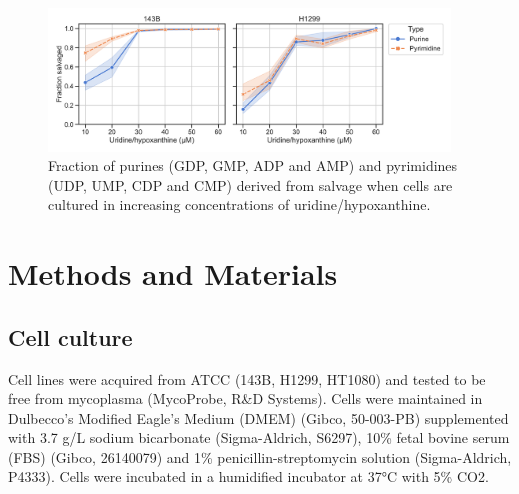\begin{figure}
    \centering
    \includegraphics[width=0.95\textwidth]{figures/chap2/sal_frac_conc.pdf}
    \caption[Salvage as a function of Urd/Hpx concentration]{
    Fraction of purines (GDP, GMP, ADP and AMP) and pyrimidines (UDP, UMP, CDP and CMP) derived from salvage when cells are cultured in increasing concentrations of uridine/hypoxanthine.
    }
    \label{fig:ch2:sal_frac_conc}
\end{figure}












\section{Methods and Materials}

\subsection{Cell culture}
Cell lines were acquired from ATCC (143B, H1299, HT1080) and tested to be free from mycoplasma (MycoProbe, R\&D Systems).
Cells were maintained in Dulbecco’s Modified Eagle’s Medium (DMEM) (Gibco, 50-003-PB) supplemented with 3.7 g/L sodium bicarbonate (Sigma-Aldrich, S6297), 10\% fetal bovine serum (FBS) (Gibco, 26140079) and 1\% penicillin-streptomycin solution (Sigma-Aldrich, P4333).
Cells were incubated in a humidified incubator at 37°C with 5\% CO2.


